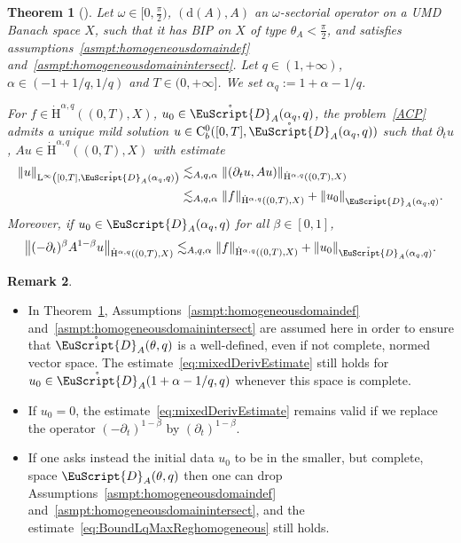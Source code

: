 \documentclass[10pt]{amsart}
\newtheorem{theo}{Theorem}[section]
\theoremstyle{definition}\newtheorem{defi}[theo]{Definition}\newtheorem{rema}[theo]{Remark}\newtheorem{exam}[theo]{Example}\newtheorem{exem}[theo]{Example}\newtheorem{nota}[theo]{Notation}
\newcommand{\rmH}{\mathrm{H}}%
\newcommand{\rmd}{\mathrm{d}}
\newcommand{\rmL}{\mathrm{L}}
\newcommand{\rmC}{\mathrm{C}}
\newcommand{\rgeusD}{\mathring{\eus{D}}}
\newcommand{\eus}{\EuScript}
\begin{document}
\begin{theo}[{\cite[Theorem~4.7]{Gaudin2023}}]\label{thm:LqMaxRegUMDHomogeneous}
Let $\omega\in [0,\frac{\pi}{2})$, $(\rmd(A),A)$ an $\omega$-sectorial operator on a UMD Banach space $X$, such that it has BIP on $X$ of type $\theta_A<\frac{\pi}{2}$, and satisfies assumptions~\eqref{asmpt:homogeneousdomaindef} and~\eqref{asmpt:homogeneousdomainintersect}. Let $q\in(1,+\infty)$, $\alpha\in(-1+1/q,1/q)$ and $T\in(0,+\infty]$. We set $\alpha_q:= 1+\alpha-1/q$.

For $f\in\dot{\rmH}^{\alpha,q}((0,T),X)$, $u_0\in \rgeusD_{A}(\alpha_q,q)$, the problem~\eqref{ACP} admits a unique mild solution $u\in \rmC ^0_b([0,T],\rgeusD_{A}(\alpha_q,q))$ such that $\partial_t u$, $Au \in \dot{\rmH}^{\alpha,q}((0,T),X)$ with estimate
\begin{equation}\label{eq:BoundLqMaxReghomogeneous}
\begin{split}
\| u \|_{\rmL^{\infty}\left([0,T],\rgeusD_{A}(\alpha_q,q)\right)} &\lesssim_{A,q,\alpha} \| (\partial_t u, Au)\|_{\dot{\rmH}^{\alpha,q}((0,T),X)}\\
&\lesssim_{A,q,\alpha}
\| f\|_{\dot{\rmH}^{\alpha,q}((0,T),X)}
+ \| u_0\|_{\rgeusD_{A}(\alpha_q,q)}.
\end{split}
\end{equation}
Moreover, if $u_0\in {\eus{D}}_{A}(\alpha_q,q)$ for all $\beta\in[0,1]$,
\begin{align}\label{eq:mixedDerivEstimate}
\left\| (-\partial_t)^{\beta} A^{1-\beta} u\right\|_{\dot{\rmH}^{\alpha,q}((0,T),X)} \lesssim_{A,q,\alpha} \| f\|_{\dot{\rmH}^{\alpha,q}((0,T),X)} + \| u_0\|_{\rgeusD_{A}(\alpha_q,q)} .
\end{align}
\end{theo}

\begin{rema}\leavevmode
\begin{itemize}
\item In Theorem~\ref{thm:LqMaxRegUMDHomogeneous}, Assumptions~\ref{asmpt:homogeneousdomaindef} and~\ref{asmpt:homogeneousdomainintersect} are assumed here in order to ensure that $\rgeusD_{A}(\theta,q)$ is a well-defined, even if not complete, normed vector space. The estimate~\eqref{eq:mixedDerivEstimate} still holds for $u_0\in \rgeusD_{A}(1+\alpha-1/q,q)$ whenever this space is complete.


\item If $u_0=0$, the estimate~\eqref{eq:mixedDerivEstimate} remains valid if we replace the operator $(-\partial_t)^{1-\beta}$ by $(\partial_t)^{1-\beta}$.

\item If one asks instead the initial data $u_0$ to be in the smaller, but complete, space ${\eus{D}}_{A}(\theta,q)$ then one can drop Assumptions~\ref{asmpt:homogeneousdomaindef} and~\ref{asmpt:homogeneousdomainintersect}, and the estimate~\eqref{eq:BoundLqMaxReghomogeneous} still holds.
\end{itemize}
\end{rema}
\end{document}
